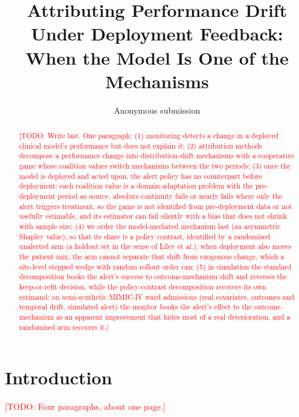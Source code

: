 \documentclass[letterpaper]{article} %
\title{Attributing Performance Drift Under Deployment Feedback: When the Model Is One of the Mechanisms}
\author{Anonymous submission}
\newcommand{\todo}[1]{\textcolor{red}{[TODO: #1]}}
\begin{document}
\maketitle

\begin{abstract}
\todo{Write last. One paragraph: (1) monitoring detects a change in a deployed
clinical model's performance but does not explain it; (2) attribution methods
decompose a performance change into distribution-shift mechanisms with a
cooperative game whose coalition values switch mechanisms between the two
periods; (3) once the model is deployed and acted upon, the alert policy has no
counterpart before deployment: each coalition value is a domain-adaptation
problem with the pre-deployment period as source, absolute continuity fails or
nearly fails where only the alert triggers treatment, so the game is not
identified from pre-deployment data or not usefully estimable, and its
estimator can fail silently with a bias that does not shrink with sample size;
(4) we order the model-mediated mechanism last
(an asymmetric Shapley value), so that its share is a policy contrast,
identified by a randomised unalerted arm (a holdout set in the sense of Liley et al.); when deployment also
moves the patient mix, the arm cannot separate that shift from exogenous change,
which a site-level stepped wedge with random rollout order can; (5) in
simulation the standard decomposition books the alert's
success to outcome-mechanism shift and reverses the keep-or-refit decision,
while the policy-contrast decomposition recovers its own estimand; on
semi-synthetic MIMIC-IV ward admissions (real covariates, outcomes and
temporal drift, simulated alert) the monitor books the alert's effect to the
outcome mechanism as an apparent improvement that hides most of a real
deterioration, and a randomised arm recovers it.}
\end{abstract}

\section{Introduction}
\label{sec:intro}

\todo{Four paragraphs, about one page.}
\end{document}
